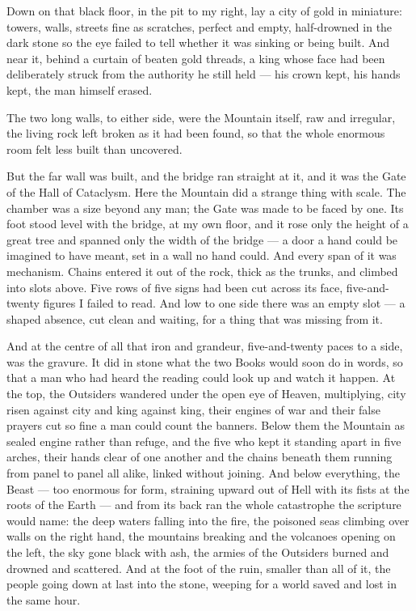 Down on that black floor, in the pit to my right, lay a city of gold in miniature: towers, walls, streets fine as scratches, perfect and empty, half-drowned in the dark stone so the eye failed to tell whether it was sinking or being built. And near it, behind a curtain of beaten gold threads, a king whose face had been deliberately struck from the authority he still held --- his crown kept, his hands kept, the man himself erased.\par

The two long walls, to either side, were the Mountain itself, raw and irregular, the living rock left broken as it had been found, so that the whole enormous room felt less built than uncovered.\par

But the far wall was built, and the bridge ran straight at it, and it was the Gate of the Hall of Cataclysm. Here the Mountain did a strange thing with scale. The chamber was a size beyond any man; the Gate was made to be faced by one. Its foot stood level with the bridge, at my own floor, and it rose only the height of a great tree and spanned only the width of the bridge --- a door a hand could be imagined to have meant, set in a wall no hand could. And every span of it was mechanism. Chains entered it out of the rock, thick as the trunks, and climbed into slots above. Five rows of five signs had been cut across its face, five-and-twenty figures I failed to read. And low to one side there was an empty slot --- a shaped absence, cut clean and waiting, for a thing that was missing from it.\par

And at the centre of all that iron and grandeur, five-and-twenty paces to a side, was the gravure. It did in stone what the two Books would soon do in words, so that a man who had heard the reading could look up and watch it happen. At the top, the Outsiders wandered under the open eye of Heaven, multiplying, city risen against city and king against king, their engines of war and their false prayers cut so fine a man could count the banners. Below them the Mountain as sealed engine rather than refuge, and the five who kept it standing apart in five arches, their hands clear of one another and the chains beneath them running from panel to panel all alike, linked without joining. And below everything, the Beast --- too enormous for form, straining upward out of Hell with its fists at the roots of the Earth --- and from its back ran the whole catastrophe the scripture would name: the deep waters falling into the fire, the poisoned seas climbing over walls on the right hand, the mountains breaking and the volcanoes opening on the left, the sky gone black with ash, the armies of the Outsiders burned and drowned and scattered. And at the foot of the ruin, smaller than all of it, the people going down at last into the stone, weeping for a world saved and lost in the same hour.\par


